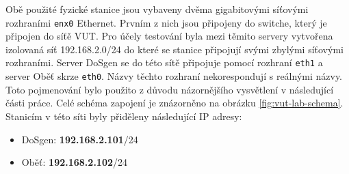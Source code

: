 \begin{table}[ht]
	\centering
	\caption{Souhrn informací o testovacích stanicích.}
	\label{tab:hw-config-lab}
\end{table}

Obě použité fyzické stanice jsou vybaveny dvěma gigabitovými síťovými rozhraními \texttt{enx0} Ethernet. Prvním z nich jsou připojeny do switche, který je připojen do síťě VUT. Pro účely testování byla mezi těmito servery vytvořena izolovaná síť 192.168.2.0/24 do které se stanice připojují svými zbylými síťovými rozhraními. Server DoSgen se do této sítě připojuje pomocí rozhraní \texttt{eth1} a server Oběť skrze \texttt{eth0}.
Názvy těchto rozhraní nekorespondují s reálnými názvy. Toto pojmenování bylo použito z důvodu názornějšího vysvětlení v následující části práce. Celé schéma zapojení je znázorněno na obrázku \ref{fig:vut-lab-schema}. Stanicím v této síti byly přiděleny následující IP adresy:
\begin{itemize}
	\item DoSgen: \textbf{192.168.2.101}/24
	\item Oběť: \textbf{192.168.2.102}/24
\end{itemize}

